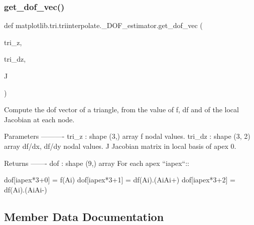 \mbox{\label{classmatplotlib_1_1tri_1_1triinterpolate_1_1__DOF__estimator_a52f8c3d59afa7c339b7785aa10f8f543}} 
\subsubsection{\texorpdfstring{get\+\_\+dof\+\_\+vec()}{get\_dof\_vec()}}
{\footnotesize\ttfamily def matplotlib.\+tri.\+triinterpolate.\+\_\+\+D\+O\+F\+\_\+estimator.\+get\+\_\+dof\+\_\+vec (\begin{DoxyParamCaption}\item[{}]{tri\+\_\+z,  }\item[{}]{tri\+\_\+dz,  }\item[{}]{J }\end{DoxyParamCaption})\hspace{0.3cm}{\ttfamily [static]}}

\begin{DoxyVerb}Compute the dof vector of a triangle, from the value of f, df and
of the local Jacobian at each node.

Parameters
----------
tri_z : shape (3,) array
    f nodal values.
tri_dz : shape (3, 2) array
    df/dx, df/dy nodal values.
J
    Jacobian matrix in local basis of apex 0.

Returns
-------
dof : shape (9,) array
    For each apex ``iapex``::

dof[iapex*3+0] = f(Ai)
dof[iapex*3+1] = df(Ai).(AiAi+)
dof[iapex*3+2] = df(Ai).(AiAi-)
\end{DoxyVerb}
 

\subsection{Member Data Documentation}
\mbox{\label{classmatplotlib_1_1tri_1_1triinterpolate_1_1__DOF__estimator_a6ef7582c428debb80338362626b24ce7}} 
